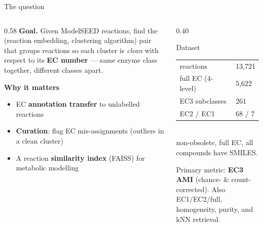 \documentclass[aspectratio=169,10pt]{beamer}
\begin{document}
\begin{frame}{The question}
  \begin{columns}[T]
    \begin{column}{0.58\textwidth}
      \textbf{Goal.} Given ModelSEED reactions, find the (reaction embedding,
      clustering algorithm) pair that groups reactions so each cluster is
      \emph{clean} with respect to its \textbf{EC number} --- same enzyme class
      together, different classes apart.

      \vspace{8pt}
      \textbf{Why it matters}
      \begin{itemize}\small
        \item EC \textbf{annotation transfer} to unlabelled reactions
        \item \textbf{Curation}: flag EC mis-assignments (outliers in a clean cluster)
        \item A reaction \textbf{similarity index} (FAISS) for metabolic modelling
      \end{itemize}
    \end{column}
    \begin{column}{0.40\textwidth}
      \begin{block}{Dataset}\small
        \begin{tabular}{@{}ll@{}}
          reactions & 13{,}721\\
          full EC (4-level) & 5{,}622\\
          EC3 subclasses & 261\\
          EC2 / EC1 & 68 / 7\\
        \end{tabular}\\[3pt]
        non-obsolete, full EC, all compounds have SMILES.
      \end{block}
      \footnotesize Primary metric: \textbf{EC3 AMI} (chance- \& count-corrected).
      Also EC1/EC2/full, homogeneity, purity, and kNN retrieval.
    \end{column}
  \end{columns}
\end{frame}
\end{document}
